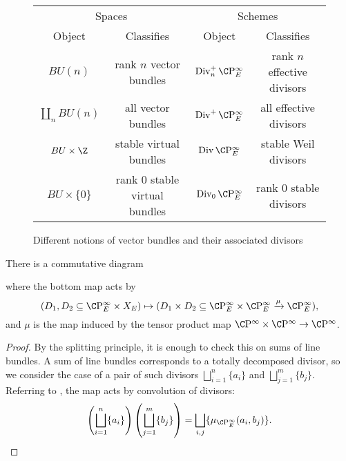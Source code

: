 \begin{figure}
\begin{center}
\begin{tabular}{@{}cccc@{}} \toprule
\multicolumn{2}{c}{Spaces} &
\multicolumn{2}{c}{Schemes}
\\
\cmidrule(r){1-2}
\cmidrule(r){3-4}
Object & Classifies & Object & Classifies \\ \midrule
\(BU(n)\) & rank \(n\) vector bundles & \(\Div_n^+ \CP^\infty_E\) & rank \(n\) effective divisors \\
\(\coprod_n BU(n)\) & all vector bundles & \(\Div^+ \CP^\infty_E\) & all effective divisors \\
\(BU \times \Z\) & stable virtual bundles & \(\Div \CP^\infty_E\) & stable Weil divisors \\
\(BU \times \{0\}\) & rank \(0\) stable virtual bundles & \(\Div_0 \CP^\infty_E\) & rank \(0\) stable divisors \\ \bottomrule
\end{tabular}
\end{center}
\caption{Different notions of vector bundles and their associated divisors}
\end{figure}

\begin{corollary}\label{ProductMapOfDivisorSchemes}
There is a commutative diagram
\begin{center}
\end{center}
where the bottom map acts by \[(D_1, D_2 \subseteq \CP^\infty_E \times X_E) \mapsto (D_1 \times D_2 \subseteq \CP^\infty_E \times \CP^\infty_E \xrightarrow{\mu} \CP^\infty_E),\] and \(\mu\) is the map induced by the tensor product map \(\CP^\infty \times \CP^\infty \to \CP^\infty\).
\end{corollary}
\begin{proof}
By the splitting principle, it is enough to check this on sums of line bundles.  A sum of line bundles corresponds to a totally decomposed divisor, so we consider the case of a pair of such divisors \(\bigsqcup_{i=1}^n \{a_i\}\) and \(\bigsqcup_{j=1}^m \{b_j\}\).  Referring to , the map acts by convolution of divisors: \[\left(\bigsqcup_{i=1}^n \{a_i\} \right) \left( \bigsqcup_{j=1}^m \{b_j\} \right) = \bigsqcup_{i, j} \{\mu_{\CP^\infty_E}(a_i, b_j)\}. \qedhere\]
\end{proof}

